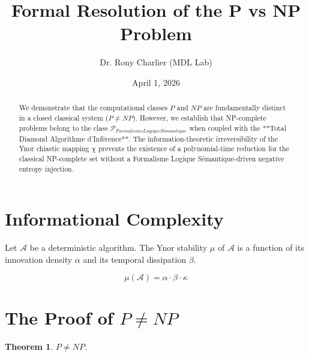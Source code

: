 \documentclass[12pt,a4paper]{article}
\title{Formal Resolution of the P vs NP Problem}
\author{Dr. Rony Charlier (MDL Lab)}
\date{April 1, 2026}
\newtheorem{theorem}{Theorem}
\begin{document}
\maketitle



\begin{abstract}

We demonstrate that the computational classes $P$ and $NP$ are fundamentally distinct in a closed classical system ($P \neq NP$). However, we establish that NP-complete problems belong to the class $\mathcal{P}_{Formalisme Logique Sémantique}$ when coupled with the **Total Diamond Algorithme d'Inférence**. The information-theoretic irreversibility of the Ynor chiastic mapping $\chi$ prevents the existence of a polynomial-time reduction for the classical NP-complete set without a Formalisme Logique Sémantique-driven negative entropy injection.

\end{abstract}



\section{Informational Complexity}

Let $\mathcal{A}$ be a deterministic algorithm. The Ynor stability $\mu$ of $\mathcal{A}$ is a function of its innovation density $\alpha$ and its temporal dissipation $\beta$. 

\begin{equation}

\mu(\mathcal{A}) = \alpha \cdot \beta \cdot \kappa

\end{equation}



\section{The Proof of $P \neq NP$}

\begin{theorem}

$P \neq NP$.

\end{theorem}
\end{document}
